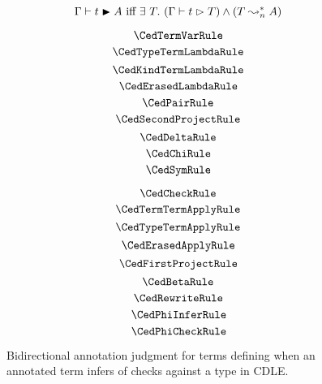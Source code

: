 
\begin{figure}
    \centering
    $$\Gamma \vdash t \blacktriangleright A \text{ iff } \exists\ T.\ (\Gamma \vdash t \vartriangleright T) \wedge (T \leadsto^*_n A)$$
    \begin{minipage}{0.5\textwidth}
        $$\CedTermVarRule$$
        $$\CedTypeTermLambdaRule$$
        $$\CedKindTermLambdaRule$$
        $$\CedErasedLambdaRule$$
        $$\CedPairRule$$
        $$\CedSecondProjectRule$$
        $$\CedDeltaRule$$
        $$\CedChiRule$$
        $$\CedSymRule$$
    \end{minipage}%
    \begin{minipage}{0.5\textwidth}
        $$\CedCheckRule$$
        $$\CedTermTermApplyRule$$
        $$\CedTypeTermApplyRule$$
        $$\CedErasedApplyRule$$
        $$\CedFirstProjectRule$$
        $$\CedBetaRule$$
        $$\CedRewriteRule$$
        $$\CedPhiInferRule$$
        $$\CedPhiCheckRule$$
    \end{minipage}%
    \caption{
        Bidirectional annotation judgment for terms defining when an annotated term infers of checks against a type in CDLE.
    }
    \label{fig:4:term}
\end{figure}
